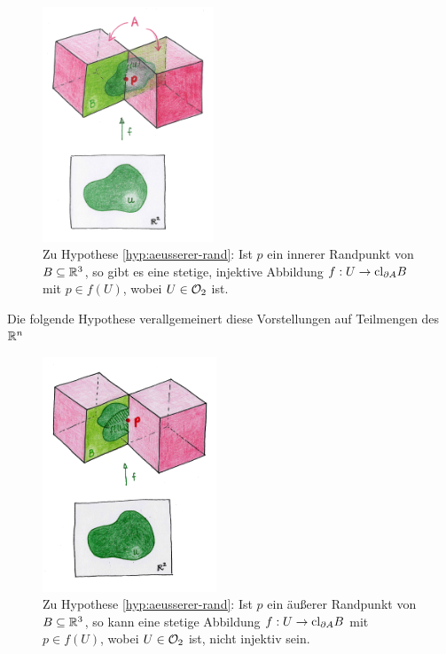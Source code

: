     \begin{figure}[ht]
        \centering
        \includegraphics[height=7cm]{bearbeitet-22-04-25/pflasterbild-innerer-rp.png}
        \caption[Zu Hypothese \ref{hyp:aeusserer-rand} (innerer Randpunkt)]{Zu Hypothese \ref{hyp:aeusserer-rand}: Ist $p$ ein innerer Randpunkt von $B \subseteq \mathbb{R}^3$, so gibt es eine stetige, injektive Abbildung $f:U \to \text{cl}_{\partial A} B$ mit $p \in f(U)$, wobei $U \in \mathcal{O}_2$ ist.}
        \label{fig:pflasterbild-innerer-rp}
    \end{figure}
    
    
    Die
    folgende Hypothese verallgemeinert diese Vorstellungen auf Teilmengen des $\mathbb{R}^n$

    \begin{figure}[ht]
        \centering
        \includegraphics[height=7cm]{bearbeitet-22-04-25/pflasterbild-aeusserer-rp.png}
        \caption[Zu Hypothese \ref{hyp:aeusserer-rand} (äußerer Randpunkt)]{Zu Hypothese \ref{hyp:aeusserer-rand}: Ist $p$ ein äußerer Randpunkt von $B \subseteq \mathbb{R}^3$, so kann eine stetige Abbildung $f:U \to \text{cl}_{\partial A} B$ mit $p \in f(U)$, wobei $U \in \mathcal{O}_2$ ist, nicht injektiv sein.}
        \label{fig:pflasterbild-aeusserer-rp}
    \end{figure}
    
